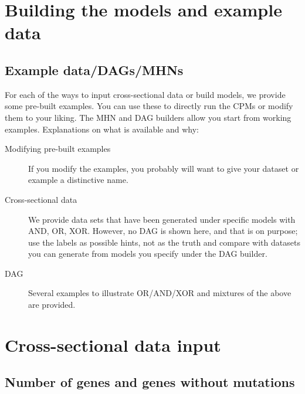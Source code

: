 \documentclass[a4paper,11pt]{article}
\begin{document}

\section{Building the models and example data}
\label{sec:build-models-example}

\subsection{Example data/DAGs/MHNs}
\label{sec:exampe-datadagsmhns}

For each of the ways to input cross-sectional data or build models, we provide some pre-built examples. You can use these to directly run the CPMs or modify them to your liking. The MHN and DAG builders allow you start from working examples. Explanations on what is available and why: 

\begin{description}
\item[Modifying pre-built examples] If you modify the examples, you probably will want to give your dataset or example a distinctive name.

  
\item[Cross-sectional data] We provide data sets that have been generated under specific models with AND, OR, XOR. However, no DAG is shown here, and that is on purpose; use the labels as possible hints, not as the truth and compare with datasets you can generate from models you specify under the DAG builder.

\item[DAG] Several examples to illustrate OR/AND/XOR and mixtures of the above are provided.
  
\end{description}


\section{Cross-sectional data input}
\label{sec:cross-sectional-data}

\subsection{Number of genes and genes without mutations}
\label{sec:number-genes-genes}
\end{document}
